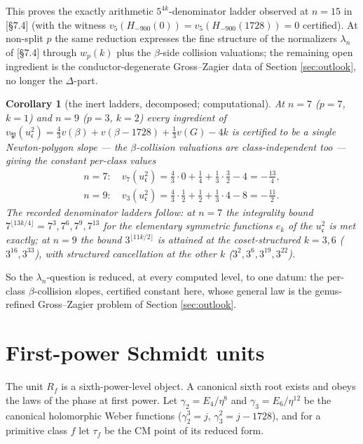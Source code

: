 \documentclass[11pt]{amsart}
\numberwithin{equation}{section}
\theoremstyle{plain}
\newtheorem{corollary}[theorem]{Corollary}
\theoremstyle{definition}
\theoremstyle{remark}
\newcommand{\idealc}{\mathfrak{c}}
\newcommand{\idealP}{\mathfrak{P}}
\newcommand{\PaperI}{\cite{SchmidtI}}
\begin{document}
This proves the exactly arithmetic $5^{4k}$-denominator ladder observed
at $n = 15$ in \PaperI[\S7.4] (with the witness $v_5(H_{-900}(0)) =
v_5(H_{-900}(1728)) = 0$ certified).  At non-split $p$ the same reduction
expresses the fine structure of the normalizers $\lambda_n$ of
\PaperI[\S7.4] through $w_p(k)$ plus the $\beta$-side collision
valuations; the remaining open ingredient is the conductor-degenerate
Gross--Zagier data of Section \ref{sec:outlook}, no longer the
$\Delta$-part.

\begin{corollary}[the inert ladders, decomposed; computational]
\label{cor:inert}
At $n = 7$ ($p = 7$, $k = 1$) and $n = 9$ ($p = 3$, $k = 2$) every
ingredient of $v_\idealP(u_\idealc^2) = \tfrac43v(\beta) + v(\beta - 1728) +
\tfrac13v(G) - 4k$ is certified to be a \emph{single} Newton-polygon
slope --- the $\beta$-collision valuations are class-independent too ---
giving the constant per-class values
\begin{gather*}
  n = 7:\quad v_7(u_\idealc^2) = \tfrac43\cdot0 + \tfrac14 + \tfrac13\cdot\tfrac32 - 4
  = -\tfrac{13}{4},\\
  n = 9:\quad v_3(u_\idealc^2) = \tfrac43\cdot\tfrac12 + \tfrac12 + \tfrac13\cdot4 - 8
  = -\tfrac{11}{2}.
\end{gather*}
The recorded denominator ladders follow: at $n = 7$ the integrality bound
$7^{\lfloor 13k/4\rfloor} = 7^3, 7^6, 7^9, 7^{13}$ for the elementary
symmetric functions $e_k$ of the $u_\idealc^2$ is met \emph{exactly}; at
$n = 9$ the bound $3^{\lfloor 11k/2\rfloor}$ is attained at the
coset-structured $k = 3, 6$ ($3^{16}, 3^{33}$), with structured
cancellation at the other $k$ ($3^2, 3^6, 3^{19}, 3^{22}$).
\end{corollary}

So the $\lambda_n$-question is reduced, at every computed level, to one
datum: the per-class $\beta$-collision slopes, certified constant here,
whose general law is the genus-refined Gross--Zagier problem of Section
\ref{sec:outlook}.

\section{First-power Schmidt units}\label{sec:firstpower}

The unit $R_f$ is a sixth-power-level object.  A canonical sixth root
exists and obeys the laws of the phase at first power.  Let $\gamma_2 =
E_4/\eta^8$ and $\gamma_3 = E_6/\eta^{12}$ be the canonical holomorphic
Weber functions ($\gamma_2^3 = j$, $\gamma_3^2 = j - 1728$), and for a
primitive class $f$ let $\tau_f$ be the CM point of its reduced form.
\end{document}
